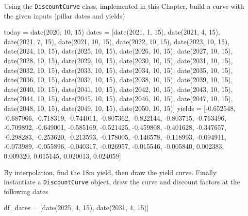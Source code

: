 \cprotEnv\begin{question}
\label{ex:yield_discount}
Using the \texttt{DiscountCurve} class, implemented in this Chapter, build a curve with the given inputs (pillar dates and yields)

\begin{ipython}
today = date(2020, 10, 15)
dates = [date(2021, 1, 15), date(2021, 4, 15), date(2021, 7, 15),
         date(2021, 10, 15), date(2022, 10, 15), date(2023, 10, 15),
         date(2024, 10, 15), date(2025, 10, 15), date(2026, 10, 15),
         date(2027, 10, 15), date(2028, 10, 15), date(2029, 10, 15),
         date(2030, 10, 15), date(2031, 10, 15), date(2032, 10, 15),
         date(2033, 10, 15), date(2034, 10, 15), date(2035, 10, 15),
         date(2036, 10, 15), date(2037, 10, 15), date(2038, 10, 15),
         date(2039, 10, 15), date(2040, 10, 15), date(2041, 10, 15),
         date(2042, 10, 15), date(2043, 10, 15), date(2044, 10, 15),
         date(2045, 10, 15), date(2046, 10, 15), date(2047, 10, 15),
         date(2048, 10, 15), date(2049, 10, 15), date(2050, 10, 15)]
yields = [-0.652548, -0.687966, -0.718319, -0.744011, -0.807362,
          -0.822144, -0.803715, -0.763496, -0.709892, -0.649001,
          -0.585169, -0.521425, -0.459808, -0.401628, -0.347657,
          -0.298283, -0.253620, -0.213593, -0.178005, -0.146578,
          -0.118993, -0.094911, -0.073989, -0.055896, -0.040317,
          -0.026957, -0.015546, -0.005840,  0.002383,  0.009320,
           0.015145,  0.020013,  0.024059]
\end{ipython}
\noindent
By interpolation, find the 18m yield, then draw the yield curve. Finally instantiate a \texttt{DiscountCurve} object, draw the curve and discount factors at the following dates
\begin{ipython}
df_dates = [date(2025, 4, 15), date(2031, 4, 15)]
\end{ipython}
\end{question}

